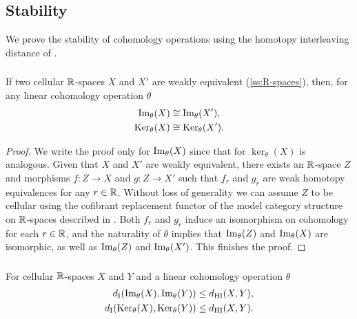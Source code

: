 \subsection{Stability}\label{ss:stability}

We prove the stability of cohomology operations using the homotopy interleaving distance of \cite{blumberg2023interleaving}.

\subsubsection{}\label{lem:w.h.e. preservance}

\lemma If two cellular $\mathbb{R}$-spaces $X$ and $X'$ are weakly equivalent (\cref{ss:R-spaces}), then, for any linear cohomology operation $\theta$
\[
\begin{split}
	\operatorname{Im}_\theta(X) & \cong \operatorname{Im}_\theta(X'), \\
	\operatorname{Ker}_\theta(X)& \cong \operatorname{Ker}_\theta(X').
\end{split}
\]

\begin{proof}
	We write the proof only for $\operatorname{Im}_\theta(X)$ since that for $\ker_\theta(X)$ is analogous.
	Given that $X$ and $X'$ are weakly equivalent, there exists an $\mathbb{R}$-space $Z$ and morphisms $f \colon Z \to X$ and $g \colon Z \to X'$ such that $f_r$ and $g_r$ are weak homotopy equivalences for any $r \in \mathbb{R}$.
	Without loss of generality we can assume $Z$ to be cellular using the cofibrant replacement functor of the model category structure on $\mathbb{R}$-spaces described in \cite{blumberg2023interleaving}.
	Both $f_r$ and $g_r$ induce an isomorphism on cohomology for each $r \in \mathbb{R}$, and the naturality of $\theta$ implies that $\operatorname{Im}_\theta(Z)$ and $\operatorname{Im}_\theta(X)$ are isomorphic, as well as $\operatorname{Im}_\theta(Z)$ and $\operatorname{Im}_\theta(X')$.
	This finishes the proof.
\end{proof}

\subsubsection{}\label{thm:stability theta}

\lemma
For cellular $\mathbb{R}$-spaces $X$ and $Y$ and a linear cohomology operation $\theta$
\begin{align*}
	d_{\mathrm{I}}(\operatorname{Im}_\theta(X), \operatorname{Im}_\theta(Y)) &\leq d_{\mathrm{HI}}(X,Y), \\
	d_{\mathrm{I}}(\operatorname{Ker}_\theta(X), \operatorname{Ker}_\theta(Y)) &\leq d_{\mathrm{HI}}(X,Y).
\end{align*}

